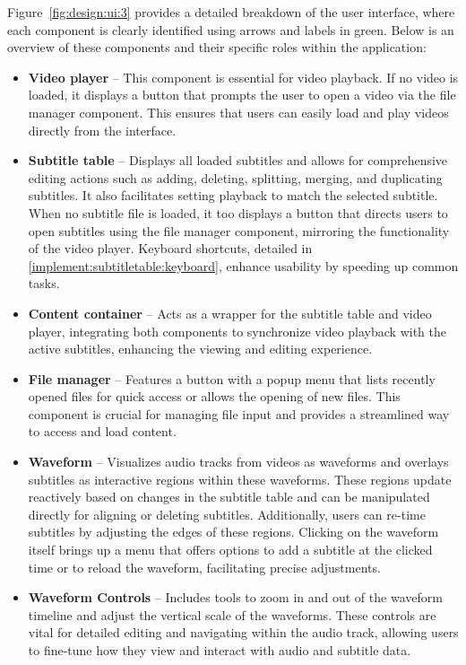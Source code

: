Figure~\ref{fig:design:ui:3} provides a detailed breakdown of the user interface, where each component is clearly identified using arrows and labels in green. Below is an overview of these components and their specific roles within the application:

\begin{itemize}
    \item \textbf{Video player} -- This component is essential for video playback. If no video is loaded, it displays a button that prompts the user to open a video via the file manager component. This ensures that users can easily load and play videos directly from the interface.
    \item \textbf{Subtitle table} -- Displays all loaded subtitles and allows for comprehensive editing actions such as adding, deleting, splitting, merging, and duplicating subtitles. It also facilitates setting playback to match the selected subtitle. When no subtitle file is loaded, it too displays a button that directs users to open subtitles using the file manager component, mirroring the functionality of the video player. Keyboard shortcuts, detailed in \ref{implement:subtitletable:keyboard}, enhance usability by speeding up common tasks.
    \item \textbf{Content container} -- Acts as a wrapper for the subtitle table and video player, integrating both components to synchronize video playback with the active subtitles, enhancing the viewing and editing experience.
    \item \textbf{File manager} -- Features a button with a popup menu that lists recently opened files for quick access or allows the opening of new files. This component is crucial for managing file input and provides a streamlined way to access and load content.
    \item \textbf{Waveform} -- Visualizes audio tracks from videos as waveforms and overlays subtitles as interactive regions within these waveforms. These regions update reactively based on changes in the subtitle table and can be manipulated directly for aligning or deleting subtitles. Additionally, users can re-time subtitles by adjusting the edges of these regions. Clicking on the waveform itself brings up a menu that offers options to add a subtitle at the clicked time or to reload the waveform, facilitating precise adjustments.
    \item \textbf{Waveform Controls} -- Includes tools to zoom in and out of the waveform timeline and adjust the vertical scale of the waveforms. These controls are vital for detailed editing and navigating within the audio track, allowing users to fine-tune how they view and interact with audio and subtitle data.
\end{itemize}

